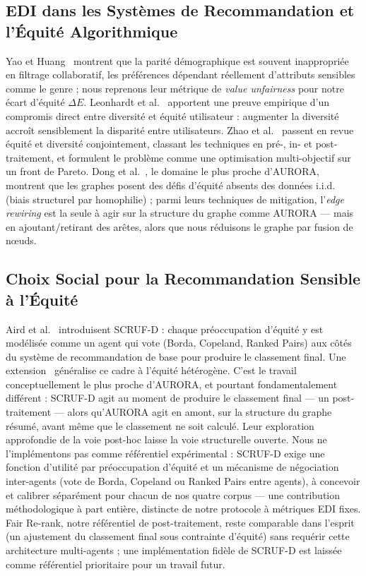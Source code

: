 \documentclass[12pt]{report}
\begin{document}
\subsection{EDI dans les Systèmes de Recommandation et l'Équité Algorithmique}

Yao et Huang~\cite{yao_new_2017} montrent que la parité démographique est
souvent inappropriée en filtrage collaboratif, les préférences dépendant
réellement d'attributs sensibles comme le genre ; nous reprenons leur
métrique de \emph{value unfairness} pour notre écart d'équité $\Delta E$.
Leonhardt et al.~\cite{leonhardt_user_2018} apportent une preuve
empirique d'un compromis direct entre diversité et équité utilisateur :
augmenter la diversité accroît sensiblement la disparité entre
utilisateurs. Zhao et al.~\cite{zhao_fairness_2024} passent en revue
équité et diversité conjointement, classant les techniques en pré-, in-
et post-traitement, et formulent le problème comme une optimisation
multi-objectif sur un front de Pareto. Dong et
al.~\cite{dong_fairness_2023}, le domaine le plus proche d'AURORA,
montrent que les graphes posent des défis d'équité absents des données
i.i.d. (biais structurel par homophilie) ; parmi leurs techniques de
mitigation, l'\emph{edge rewiring} est la seule à agir sur la structure
du graphe comme AURORA --- mais en ajoutant/retirant des arêtes, alors que
nous réduisons le graphe par fusion de nœuds.

\subsection{Choix Social pour la Recommandation Sensible à l'Équité}

Aird et al.~\cite{aird_exploring_2023} introduisent SCRUF-D : chaque
préoccupation d'équité y est modélisée comme un agent qui vote (Borda,
Copeland, Ranked Pairs) aux côtés du système de recommandation de base pour produire
le classement final. Une extension~\cite{aird_social_2024} généralise ce
cadre à l'équité hétérogène. C'est le travail conceptuellement le plus
proche d'AURORA, et pourtant fondamentalement différent : SCRUF-D agit au
moment de produire le classement final --- un post-traitement --- alors
qu'AURORA agit en amont, sur la structure du graphe résumé, avant même que
le classement ne soit calculé. Leur exploration approfondie de la voie
post-hoc laisse la voie structurelle ouverte. Nous ne l'implémentons pas
comme référentiel expérimental : SCRUF-D exige une fonction d'utilité par
préoccupation d'équité et un mécanisme de négociation inter-agents (vote
de Borda, Copeland ou Ranked Pairs entre agents), à concevoir et calibrer
séparément pour chacun de nos quatre corpus --- une contribution
méthodologique à part entière, distincte de notre protocole à métriques
EDI fixes. Fair Re-rank, notre référentiel de post-traitement, reste
comparable dans l'esprit (un ajustement du classement final sous
contrainte d'équité) sans requérir cette architecture multi-agents ; une
implémentation fidèle de SCRUF-D est laissée comme référentiel
prioritaire pour un travail futur.
\end{document}
